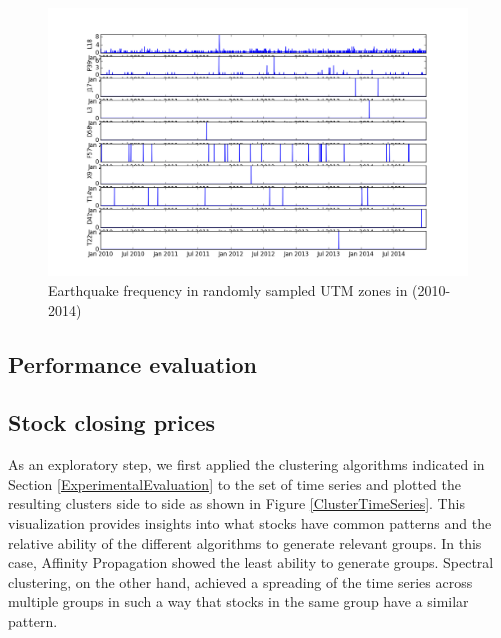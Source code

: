 \documentclass{article}
\begin{document}
\begin{figure}
\includegraphics[width=0.99\textwidth]{../earthquakedata/output_plot/eq_ts_char.png}
\caption{Earthquake frequency in randomly sampled UTM zones in (2010-2014)}
\label{CharacterOfEarthquake}
\end{figure}



\subsection{Performance evaluation}

\subsection{Stock closing prices}

As an exploratory step, we first applied the clustering algorithms indicated in Section \ref{ExperimentalEvaluation} to the set of time series and plotted the resulting clusters side to side as shown in Figure \ref{ClusterTimeSeries}. This visualization provides insights into what stocks have common patterns and the relative ability of the different algorithms to generate relevant groups. In this case, Affinity Propagation showed the least ability to generate groups. Spectral clustering, on the other hand, achieved a spreading of the time series across multiple groups in such a way that stocks in the same group have a similar pattern.
\end{document}
